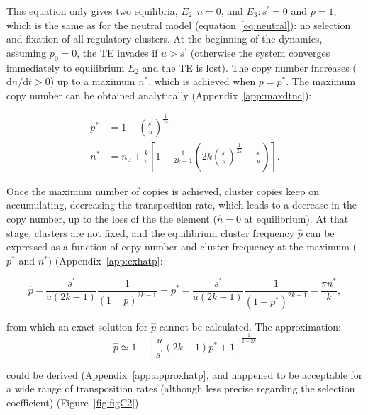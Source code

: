 \documentclass[10pt,a4paper]{article}
\begin{document}
This equation only gives two equilibria, $E_2: \bar n = 0$, and $E_3: s^\prime=0$ and $p=1$, which is the same as for the neutral model (equation~\ref{eq:neutral}): no selection and fixation of all regulatory clusters. At the beginning of the dynamics, assuming $p_0 = 0$, the TE invades if $u > s^\prime$ (otherwise the system converges immediately to equilibrium $E_2$ and the TE is lost). The copy number increases ($\mathrm d n/\mathrm d t > 0$) up to a maximum $n^\ast$, which is achieved when $p=p^\ast$. The maximum copy number can be obtained analytically (Appendix~\ref{app:maxdtnc}):

\begin{equation}\label{eq:maxdtnc}
\begin{split}
	p^\ast &= 1-\left(\frac{s^\prime}{u}\right)^\frac{1}{2k} \\
	n^\ast &= n_0 + \frac{k}{\pi}\left[ 1- \frac{1}{2k-1} \left(2k\left(\frac{s^\prime}{u}\right)^\frac{1}{2k} - \frac{s^\prime}{u}\right) \right].
\end{split}  
\end{equation}

Once the maximum number of copies is achieved, cluster copies keep on accumulating, decreasing the transposition rate, which leads to a decrease in the copy number, up to the loss of the the element ($\hat n = 0$ at equilibrium). At that stage, clusters are not fixed, and the equilibrium cluster frequency $\hat p$ can be expressed as a function of copy number and cluster frequency at the maximum ($p^\ast$ and $n^\ast$) (Appendix~\ref{app:exhatp}:

\begin{equation}\label{eq:exhatp}
	\hat{p} - \frac{s^\prime}{u(2k-1)}\frac{1}{(1-\hat p)^{2k-1}} = p^\ast - \frac{s^\prime}{u(2k-1)}\frac{1}{(1-p^\ast)^{2k-1}} - \frac{\pi n^\ast}{k},
\end{equation}

\noindent from which an exact solution for $\hat p$ cannot be calculated. The approximation:
\begin{equation}\label{eq:approxhatp}
	\hat p \simeq 1-\left[\frac{u}{s^\prime}(2k-1)p^\ast +1\right]^\frac{1}{1-2k}
\end{equation}

\noindent could be derived (Appendix~\ref{app:approxhatp}, and happened to be acceptable for a wide range of transposition rates (although less precise regarding the selection coefficient) (Figure~\ref{fig:figC2}). 
\end{document}
